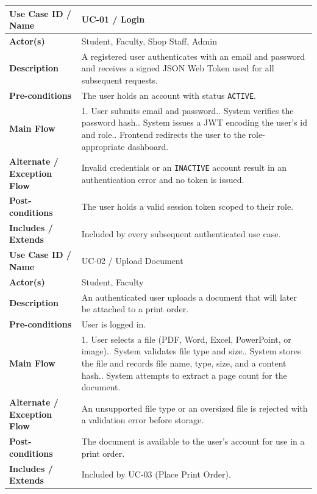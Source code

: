 \documentclass[12pt,a4paper]{report}
\begin{document}
\begin{center}
\renewcommand{\arraystretch}{1.3}
\begin{longtable}{|p{3.3cm}|p{10.7cm}|}
\hline
\textbf{Use Case ID / Name} & UC-01 / Login \\ \hline
\textbf{Actor(s)} & Student, Faculty, Shop Staff, Admin \\ \hline
\textbf{Description} & A registered user authenticates with an email and password and receives a signed JSON Web Token used for all subsequent requests. \\ \hline
\textbf{Pre-conditions} & The user holds an account with status \texttt{ACTIVE}. \\ \hline
\textbf{Main Flow} & 1. User submits email and password.\newline 2. System verifies the password hash.\newline 3. System issues a JWT encoding the user's id and role.\newline 4. Frontend redirects the user to the role-appropriate dashboard. \\ \hline
\textbf{Alternate / Exception Flow} & Invalid credentials or an \texttt{INACTIVE} account result in an authentication error and no token is issued. \\ \hline
\textbf{Post-conditions} & The user holds a valid session token scoped to their role. \\ \hline
\textbf{Includes / Extends} & Included by every subsequent authenticated use case. \\ \hline

\textbf{Use Case ID / Name} & UC-02 / Upload Document \\ \hline
\textbf{Actor(s)} & Student, Faculty \\ \hline
\textbf{Description} & An authenticated user uploads a document that will later be attached to a print order. \\ \hline
\textbf{Pre-conditions} & User is logged in. \\ \hline
\textbf{Main Flow} & 1. User selects a file (PDF, Word, Excel, PowerPoint, or image).\newline 2. System validates file type and size.\newline 3. System stores the file and records file name, type, size, and a content hash.\newline 4. System attempts to extract a page count for the document. \\ \hline
\textbf{Alternate / Exception Flow} & An unsupported file type or an oversized file is rejected with a validation error before storage. \\ \hline
\textbf{Post-conditions} & The document is available to the user's account for use in a print order. \\ \hline
\textbf{Includes / Extends} & Included by UC-03 (Place Print Order). \\ \hline


\end{longtable}
\end{center}
\end{document}

